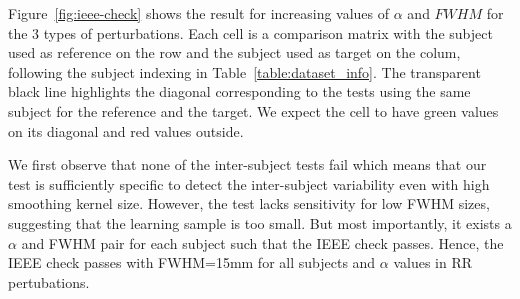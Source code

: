 \documentclass{article}
\begin{document}
Figure~\ref{fig:ieee-check} shows the result for increasing values of $\alpha$ and $FWHM$ for the 3 types of perturbations.
Each cell is a comparison matrix with the subject used as reference on the row
and the subject used as target on the colum, following the subject indexing in Table~\ref{table:dataset_info}.
The transparent black line highlights the diagonal corresponding to the tests using the same subject for the reference and
the target. We expect the cell to have green values on its diagonal and red values outside.

We first observe that none of the inter-subject tests fail which means that our test is sufficiently
specific to detect the inter-subject variability even with high smoothing kernel size. However, the test lacks sensitivity for low FWHM sizes, suggesting
that the learning sample is too small. But most importantly, it exists a $\alpha$ and FWHM pair for each subject such that
the IEEE check passes. Hence, the IEEE check passes with FWHM=15mm for all subjects and $\alpha$ values in RR pertubations.
\end{document}
